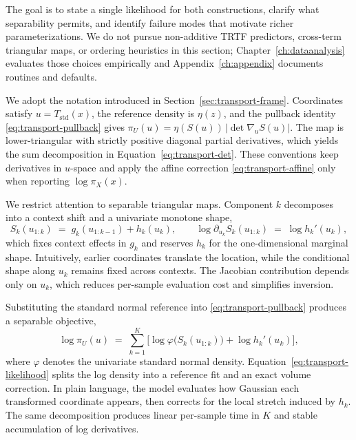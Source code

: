 \documentclass[11pt,a4paper,twoside]{book}\usepackage[]{graphicx}\usepackage[]{xcolor}
\begin{document}
The goal is to state a single likelihood for both constructions, clarify what separability permits, and identify failure modes that motivate richer parameterizations. We do not pursue non-additive TRTF predictors, cross-term triangular maps, or ordering heuristics in this section; Chapter~\ref{ch:dataanalysis} evaluates those choices empirically and Appendix~\ref{ch:appendix} documents routines and defaults.

We adopt the notation introduced in Section~\ref{sec:transport-frame}. Coordinates satisfy $u=T_{\mathrm{std}}(x)$, the reference density is $\eta(z)$, and the pullback identity \eqref{eq:transport-pullback} gives $\pi_U(u)=\eta(S(u))\,|\det\nabla_u S(u)|$. The map is lower-triangular with strictly positive diagonal partial derivatives, which yields the sum decomposition in Equation~\eqref{eq:transport-det}. These conventions keep derivatives in $u$-space and apply the affine correction \eqref{eq:transport-affine} only when reporting $\log \pi_X(x)$.

We restrict attention to separable triangular maps. Component $k$ decomposes into a context shift and a univariate monotone shape,
\begin{equation}
  S_k(u_{1:k}) \;=\; g_k(u_{1:k-1}) + h_k(u_k),\qquad \log \partial_{u_k}S_k(u_{1:k}) \;=\; \log h_k'(u_k),\label{eq:transport-separable}
\end{equation}
which fixes context effects in $g_k$ and reserves $h_k$ for the one-dimensional marginal shape. Intuitively, earlier coordinates translate the location, while the conditional shape along $u_k$ remains fixed across contexts. The Jacobian contribution depends only on $u_k$, which reduces per-sample evaluation cost and simplifies inversion.

Substituting the standard normal reference into \eqref{eq:transport-pullback} produces a separable objective,
\begin{equation}
  \log \pi_U(u) \;=\; \sum_{k=1}^{K}\Big[\log \varphi\!\big(S_k(u_{1:k})\big) + \log h_k'(u_k)\Big],\label{eq:transport-likelihood}
\end{equation}
where $\varphi$ denotes the univariate standard normal density. Equation~\eqref{eq:transport-likelihood} splits the log density into a reference fit and an exact volume correction. In plain language, the model evaluates how Gaussian each transformed coordinate appears, then corrects for the local stretch induced by $h_k$. The same decomposition produces linear per-sample time in $K$ and stable accumulation of log derivatives.
\end{document}
